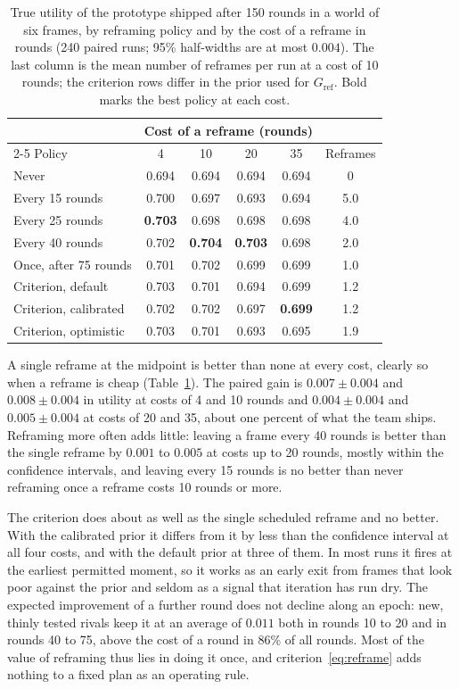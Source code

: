 \documentclass[preprint,review,11pt,authoryear]{elsarticle}
\theoremstyle{definition}
\begin{document}
\begin{table}[t]
\caption{True utility of the prototype shipped after 150 rounds in a world of six frames, by reframing policy and by the cost of a reframe in rounds (240 paired runs; 95\% half-widths are at most $0.004$). The last column is the mean number of reframes per run at a cost of 10 rounds; the criterion rows differ in the prior used for $G_{\mathrm{ref}}$. Bold marks the best policy at each cost.}
\label{tab:reframe}
\centering\small
\begin{tabular}{@{}lccccc@{}}
\toprule
& \multicolumn{4}{c}{Cost of a reframe (rounds)} & \\
\cmidrule(lr){2-5}
Policy & 4 & 10 & 20 & 35 & Reframes\\
\midrule
Never & 0.694 & 0.694 & 0.694 & 0.694 & 0\\
\addlinespace[2pt]
Every 15 rounds & 0.700 & 0.697 & 0.693 & 0.694 & 5.0\\
Every 25 rounds & \textbf{0.703} & 0.698 & 0.698 & 0.698 & 4.0\\
Every 40 rounds & 0.702 & \textbf{0.704} & \textbf{0.703} & 0.698 & 2.0\\
Once, after 75 rounds & 0.701 & 0.702 & 0.699 & 0.699 & 1.0\\
\addlinespace[2pt]
Criterion, default & 0.703 & 0.701 & 0.694 & 0.699 & 1.2\\
Criterion, calibrated & 0.702 & 0.702 & 0.697 & \textbf{0.699} & 1.2\\
Criterion, optimistic & 0.703 & 0.701 & 0.693 & 0.695 & 1.9\\
\bottomrule
\end{tabular}
\end{table}

A single reframe at the midpoint is better than none at every cost, clearly so when a reframe is cheap (Table~\ref{tab:reframe}). The paired gain is $0.007\pm0.004$ and $0.008\pm0.004$ in utility at costs of 4 and 10 rounds and $0.004\pm0.004$ and $0.005\pm0.004$ at costs of 20 and 35, about one percent of what the team ships. Reframing more often adds little: leaving a frame every 40 rounds is better than the single reframe by $0.001$ to $0.005$ at costs up to 20 rounds, mostly within the confidence intervals, and leaving every 15 rounds is no better than never reframing once a reframe costs 10 rounds or more.

The criterion does about as well as the single scheduled reframe and no better. With the calibrated prior it differs from it by less than the confidence interval at all four costs, and with the default prior at three of them. In most runs it fires at the earliest permitted moment, so it works as an early exit from frames that look poor against the prior and seldom as a signal that iteration has run dry. The expected improvement of a further round does not decline along an epoch: new, thinly tested rivals keep it at an average of $0.011$ both in rounds 10 to 20 and in rounds 40 to 75, above the cost of a round in 86\% of all rounds. Most of the value of reframing thus lies in doing it once, and criterion~\eqref{eq:reframe} adds nothing to a fixed plan as an operating rule.
\end{document}
